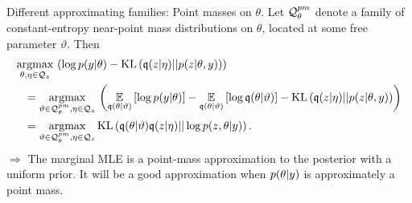 
\begin{frame}{Different approximating families: Point masses on $\theta$.}
%
Let $\mathcal{Q}_{\theta}^{pm}$ denote a family of
constant-entropy near-point mass distributions on $\theta$, located at
some free parameter $\vartheta$.  Then
%
\begin{align*}
%
\MoveEqLeft
\argmax{\theta, \eta \in \qdom_\z}
\left(
\log p(\y | \theta) -
    \kl{\q(\z | \eta)}{p(\z | \theta, \y)}  \right)
\\={}&
%
\argmax{\vartheta \in \qdom_{\theta}^{pm}, \eta \in \qdom_\z}
\left(
\expect{\q(\theta \vert \vartheta)}{\log p(\y | \theta)} -
\expect{\q(\theta \vert \vartheta)}{\log \q(\theta | \vartheta)} -
    \kl{\q(\z | \eta)}{p(\z | \theta, \y)}
\right)
\\={}&
\argmax{\vartheta \in \qdom_{\theta}^{pm}, \eta \in \qdom_\z}
\kl{\q(\theta \vert \vartheta) \q(\z \vert \eta)}{\log p(\z, \theta \vert \y)}.
%
\end{align*}
%
$\Rightarrow$ The marginal MLE is a point-mass approximation to the
posterior with a uniform prior.  It will be a good approximation when
$p(\theta \vert y)$ is approximately a point mass.

\end{frame}




